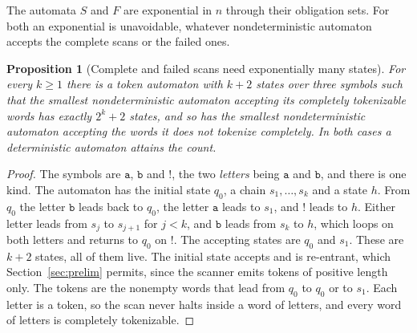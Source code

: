 \documentclass[11pt,a4paper]{article}
\theoremstyle{definition}
\theoremstyle{plain}
\newtheorem{proposition}{Proposition}
\newcommand{\code}[1]{\texttt{#1}}
\begin{document}
The automata $S$ and $F$ are exponential in $n$ through their obligation sets. For both an exponential is unavoidable,
whatever nondeterministic automaton accepts the complete scans or the failed ones.

\begin{proposition}[Complete and failed scans need exponentially many states]
\label{prop:exponential}
For every $k \geq 1$ there is a token automaton with $k + 2$ states over three symbols such that the smallest
nondeterministic automaton accepting its completely tokenizable words has exactly $2^k + 2$ states, and so has the
smallest nondeterministic automaton accepting the words it does not tokenize completely. In both cases a deterministic
automaton attains the count.
\end{proposition}

\begin{proof}
The symbols are $\code{a}$, $\code{b}$ and $\code{!}$, the two \emph{letters} being $\code{a}$ and $\code{b}$, and there
is one kind. The automaton has the initial state $q_0$, a chain $s_1, \ldots, s_k$ and a state $h$. From $q_0$ the
letter $\code{b}$ leads back to $q_0$, the letter $\code{a}$ leads to $s_1$, and $\code{!}$ leads to $h$. Either letter
leads from $s_j$ to $s_{j+1}$ for $j < k$, and $\code{b}$ leads from $s_k$ to $h$, which loops on both letters and
returns to $q_0$ on $\code{!}$. The accepting states are $q_0$ and $s_1$. These are $k + 2$ states, all of them live.
The initial state accepts and is re-entrant, which Section~\ref{sec:prelim} permits, since the scanner emits tokens of
positive length only. The tokens are the nonempty words that lead from $q_0$ to $q_0$ or to $s_1$. Each letter is a
token, so the scan never halts inside a word of letters, and every word of letters is completely tokenizable.


\end{proof}
\end{document}
